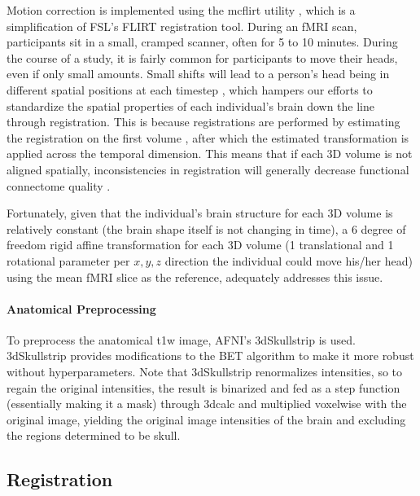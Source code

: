 \documentclass[11pt]{article}
\begin{document}
Motion correction is implemented using the mcflirt utility \cite{Jenkinson2002}, which is a simplification of FSL's FLIRT registration tool.
During an fMRI scan, participants sit in a small, cramped scanner, often for  5 to 10 minutes. During the course of a study, it is fairly common for participants to move their heads, even if only small amounts. Small shifts will lead to a person's head being in different spatial positions at each timestep \cite{Friston1996}, which hampers our efforts to standardize the spatial properties of each individual's brain down the line through registration. This is because registrations are performed by estimating the registration on the first volume \cite{fsl1, fsl2, fsl3}, after which the estimated transformation is applied across the temporal dimension. This means that if each 3D volume is not aligned spatially, inconsistencies in registration will generally decrease functional connectome quality \cite{VanDijk2012}.

Fortunately, given that the individual's brain structure for each 3D volume is relatively constant (the brain shape itself is not changing in time), a 6 degree of freedom rigid affine transformation for each 3D volume (1 translational and 1 rotational parameter per $x, y, z$ direction the individual could move his/her head) using the mean fMRI slice as the reference, adequately addresses this issue. 

\paragraph{Anatomical Preprocessing}

\label{app:aprep}
To preprocess the anatomical t1w image, AFNI's 3dSkullstrip \cite{AFNI} is used. 3dSkullstrip provides modifications to the BET algorithm \cite{Jenkinson2005} to make it more robust without hyperparameters. Note that 3dSkullstrip renormalizes intensities, so to regain the original intensities, the result is binarized and fed as a step function (essentially making it a mask) through 3dcalc and multiplied voxelwise with the original image, yielding the original image intensities of the brain and excluding the regions determined to be skull.

\subsection{Registration}


\label{app:freg}



\end{document}
